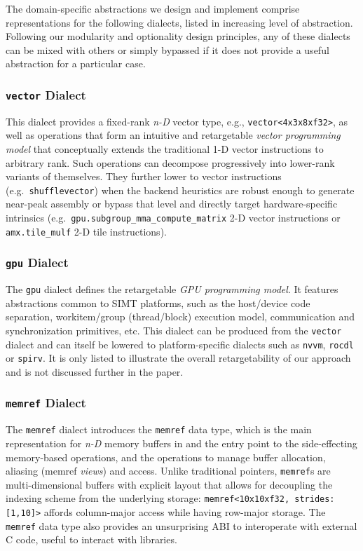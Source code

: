 The domain-specific abstractions we design and implement comprise representations for the following dialects, listed in increasing level of abstraction.
Following our modularity and optionality design principles, any of these dialects can be mixed with others or simply bypassed if it does not provide a useful abstraction for a particular case.

\subsubsection{\lstinline|vector| Dialect}
\label{sec:vector-dialect}

This dialect provides a fixed-rank \emph{n-D} vector type, e.g., \lstinline|vector<4x3x8xf32>|, as well as operations that form an intuitive and retargetable \emph{vector programming model} that conceptually extends the traditional 1-D vector instructions to arbitrary rank.
Such operations can decompose progressively into lower-rank variants of themselves. They further lower to \LLVM vector instructions (e.g.\ \lstinline|shufflevector|) when the backend heuristics are robust enough to generate near-peak assembly or bypass that level and directly target hardware-specific intrinsics (e.g.\ \lstinline{gpu.subgroup_mma_compute_matrix} 2-D vector instructions or \lstinline{amx.tile_mulf} 2-D tile instructions).

\subsubsection{\lstinline{gpu} Dialect}

The \lstinline{gpu} dialect defines the retargetable \emph{GPU programming model}.
It features abstractions common to SIMT platforms, such as the host/device code separation, workitem/group (thread/block) execution model, communication and synchronization primitives, etc.
This dialect can be produced from the \lstinline{vector} dialect and can itself be lowered to platform-specific dialects such as \lstinline{nvvm}, \lstinline{rocdl} or \lstinline{spirv}.
It is only listed to illustrate the overall retargetability of our approach and is not discussed further in the paper.

\subsubsection{\lstinline|memref| Dialect}

The \lstinline|memref| dialect introduces the \lstinline|memref| data type, which is the main representation for \emph{n-D} memory buffers in \MLIR and the entry point to the side-effecting memory-based operations, and the operations to manage buffer allocation, aliasing (memref \emph{views}) and access.
Unlike traditional pointers, \lstinline|memref|s are multi-dimensional buffers with explicit layout that allows for decoupling the indexing scheme from the underlying storage: \lstinline|memref<10x10xf32, strides: [1,10]>| affords column-major access while having row-major storage.
The \lstinline|memref| data type also provides an unsurprising ABI to interoperate with external C code, useful to interact with libraries.

